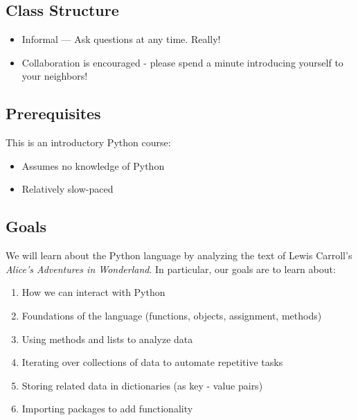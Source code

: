\documentclass[
]{book}
\providecommand{\tightlist}{%
  \setlength{\itemsep}{0pt}\setlength{\parskip}{0pt}}
\begin{document}
\hypertarget{class-structure-4}{%
\subsection{Class Structure}\label{class-structure-4}}

\begin{itemize}
\tightlist
\item
  Informal --- Ask questions at any time. Really!
\item
  Collaboration is encouraged - please spend a minute introducing yourself to your neighbors!
\end{itemize}

\hypertarget{prerequisites-4}{%
\subsection{Prerequisites}\label{prerequisites-4}}

This is an introductory Python course:

\begin{itemize}
\tightlist
\item
  Assumes no knowledge of Python
\item
  Relatively slow-paced
\end{itemize}

\hypertarget{goals-2}{%
\subsection{Goals}\label{goals-2}}

We will learn about the Python language by analyzing the text of Lewis Carroll's \emph{Alice's Adventures in Wonderland}.
In particular, our goals are to learn about:

\begin{enumerate}
\def\labelenumi{\arabic{enumi}.}
\tightlist
\item
  How we can interact with Python
\item
  Foundations of the language (functions, objects, assignment, methods)
\item
  Using methods and lists to analyze data
\item
  Iterating over collections of data to automate repetitive tasks
\item
  Storing related data in dictionaries (as key - value pairs)
\item
  Importing packages to add functionality
\end{enumerate}
\end{document}
